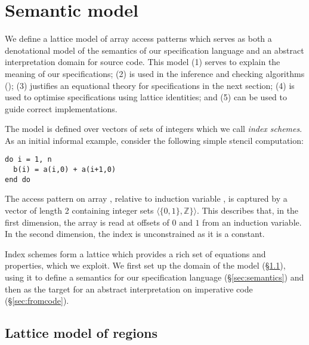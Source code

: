 \documentclass[acmlarge,review,anonymous]{acmart}\settopmatter{printfolios=true}
\theoremstyle{definition}
\newtheorem{defn}{Definition}
\theoremstyle{plain}
\theoremstyle{remark}
\begin{document}
\section{Semantic model}
\label{sec:model}

\noindent
We define a lattice model of array access patterns which serves as both a
denotational model of the semantics of our specification language and an
abstract interpretation domain for source code. This model (1) serves to
explain the meaning of our specifications; (2) is used in the inference and
checking algorithms (); (3) justifies an equational theory
for specifications in the next section; (4) is used to optimise specifications
using lattice identities; and (5) can be used to guide correct implementations.

The model is defined over vectors of sets of integers which we call
\emph{index schemes}.  As an initial informal example, consider the
following simple stencil computation:
%
\begin{verbatim}
do i = 1, n
  b(i) = a(i,0) + a(i+1,0)
end do
\end{verbatim}
%
The access pattern on array , relative
to induction variable , is captured
by a vector of length 2 containing integer sets $\langle{\{0, 1\},
  \mathbb{Z}\}}\rangle$. This describes that, in the first dimension,
the array is read at offsets of $0$ and $1$ from an induction
variable. In the second dimension, the index is unconstrained
as it is a constant.

Index schemes form a lattice which provides a rich set of equations
and properties, which we exploit. We first set up the 
domain of the model (\S\ref{sec:domain}), using it to define a semantics
for our specification language (\S\ref{sec:semantics}) and then as
the target for an abstract interpretation on imperative
code (\S\ref{sec:fromcode}).

\subsection{Lattice model of regions}
\label{sec:domain} 

\end{document}
